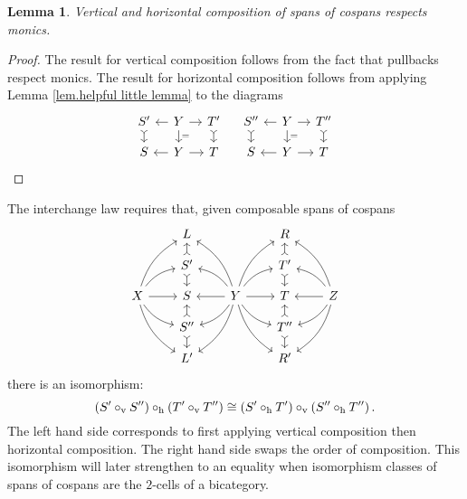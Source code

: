 \documentclass[11pt]{amsart}
\renewcommand{\t}[1]{\textup{#1}}
\newtheorem{lem}[thm]{Lemma}
\theoremstyle{remark}
\theoremstyle{definition}
\begin{document}
\begin{lem}
	Vertical and horizontal composition of 
	spans of cospans respects monics.
\end{lem}
\begin{proof}
	The result for vertical composition 
	follows from the fact that pullbacks 
	respect monics. The result for horizontal 
	composition follows from applying Lemma 
	\ref{lem.helpful little lemma} to the 
	diagrams
	\[
	\begin{tikzcd}[column sep=1.0em,row 
	sep=1.0em]
	{S'}
		\ar[d,rightarrowtail] &
	{Y} 
		\ar[d,"="] 
		\ar[r]
		\ar[l]
	&
	{T'} 
		\ar[d,rightarrowtail] \\
	{S} &
	{Y} 
		\ar[r] 
		\ar[l] &
	{T} 
	\end{tikzcd}
	\quad
	\begin{tikzcd}[column sep=1.0em,row sep=1.0em]
	{S''}
		\ar[d,rightarrowtail] &
	{Y} 
		\ar[d,"="] 
		\ar[r]
		\ar[l]&
	{T''} 
		\ar[d,rightarrowtail] \\
	{S} &
	{Y} 
		\ar[r] 
		\ar[l] &
	{T} 
	\end{tikzcd}
	\qedhere
	\]
\end{proof}

The interchange law requires that, given composable spans of cospans
\begin{equation}
\label{diag.2cells interchanged}
\begin{tikzcd}[column sep=2em,row sep=1em]
{} & 
{L} & 
{} & 
{R} & 
{} \\
{} & 
{S'}
\ar[u,rightarrowtail]
\ar[d,rightarrowtail] & 
{} & 
{T'}
\ar[u,rightarrowtail]
\ar[d,rightarrowtail]& 
{} \\
{X} 
\ar[ruu,bend left=20]
\ar[ru, bend left=20]
\ar[r]
\ar[rd, bend right=20]
\ar[rdd, bend right=20] & 
{S} & 
{Y} 
\ar[luu, bend right=20]
\ar[lu, bend right=20]
\ar[l]
\ar[ld, bend left=20]
\ar[ldd, bend left=20]
\ar[ruu, bend left=20]
\ar[ru, bend left=20]
\ar[r]
\ar[rd, bend right=20]
\ar[rdd, bend right=20] & 
{T} & 
{Z} 
\ar[luu, bend right=20]
\ar[lu, bend right=20]
\ar[l]
\ar[ld, bend left=20]
\ar[ldd, bend left=20]\\
{} & 
{S''}
\ar[u,rightarrowtail]
\ar[d,rightarrowtail]& 
{} & 
{T''}
\ar[u,rightarrowtail]
\ar[d,rightarrowtail]& 
{} \\
{} & 
{L'} &
{} & 
{R'} & 
{}
\end{tikzcd} 
\end{equation}
there is an isomorphism:
%
\begin{equation} 
\label{eq.interchange equation}
\left( S' \circ_\t{v} S'' \right) \circ_\t{h} 
\left( T' \circ_\t{v} T'' \right) \cong
\left( S' \circ_\t{h} T' \right) \circ_\t{v} 
\left( S'' \circ_\t{h} T'' \right).
\end{equation}
%
The left hand side corresponds to first applying vertical composition then horizontal composition.  The right hand side swaps the order of composition. This isomorphism will later strengthen to an equality when isomorphism classes of spans of cospans are the $2$-cells of a bicategory.
\end{document}
